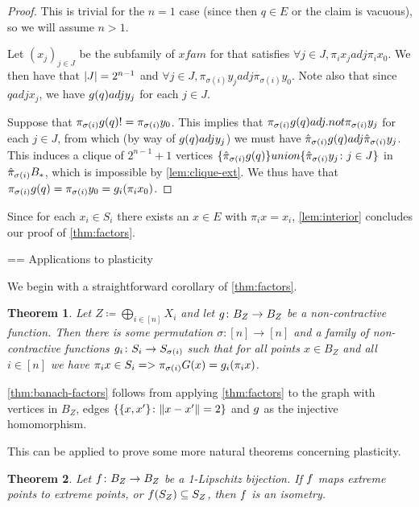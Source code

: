 \documentclass{amsart}
\newtheorem{theorem}{Theorem}
\theoremstyle{definition}
\begin{document}
\begin{proof} 

  This is trivial for the $n=1$ case (since then $q \in E$ or the claim is vacuous), so we will assume $n > 1$.

  Let $(x_j)_{j \in J}$ be the subfamily of $xfam$ for that satisfies $\forall j \in J, \pi_i x_j adj \pi_i x_0$. We then have that $\abs{J} = 2^{n-1}$ and $\forall j \in J, \pi_{\sigma(i)}y_j adj \pi_{\sigma(i)} y_0$. Note also that since $q adj x_j$, we have $g(q) adj y_j$ for each $j \in J$.

  Suppose that $\pi_{\sigma(i)} g(q) != \pi_{\sigma(i)} y_0$. This implies that $\pi_{\sigma(i)}g(q) adj.not \pi_{\sigma(i)}y_j$ for each $j \in J$, from which (by way of $g(q) adj y_j$) we must have $\hat{\pi}_{\sigma(i)}g(q) adj \hat{\pi}_{\sigma(i)}y_j$. This induces a clique of $2^{n-1}+1$ vertices $\{\hat{\pi}_{\sigma(i)}g(q)\} union \{\hat{\pi}_{\sigma(i)}y_j  \colon  j \in J\}$ in $\hat{\pi}_{\sigma(i)}B_*$, which is impossible by \autoref{lem:clique-ext}. We thus have that $\pi_{\sigma(i)} g(q) = \pi_{\sigma(i)}y_0 = g_i (\pi_i x_0)$.
\end{proof}
 

Since for each $x_i \in S_i$ there exists an $x \in E$ with $\pi_i x = x_i$, \autoref{lem:interior} concludes our proof of  \autoref{thm:factors}.


== Applications to plasticity

We begin with a straightforward corollary of  \autoref{thm:factors}.

\begin{theorem} \label{thm:banach-factors}
\annotation
  Let $Z \coloneqq \bigoplus_{i \in [n]} X_i$ and let $g \colon B_Z \to B_Z$ be a non-contractive function. Then there is some permutation $\sigma \colon [n] \to [n]$ and a family of non-contractive functions $g_i \colon S_i \to S_{\sigma(i)}$ such that for all points $x \in B_Z$ and all $i \in [n]$ we have 
  $\pi_i x \in S_i => \pi_{\sigma(i)} G(x) = g_i (\pi_i x)$.
\end{theorem}

\autoref{thm:banach-factors} follows from applying  \autoref{thm:factors} to the graph with vertices in $B_Z$, edges $\{\{x,x'\} \colon \norm{x-x'}=2\}$ and $g$ as the injective homomorphism.

This can be applied to prove some more natural theorems concerning plasticity.

\begin{theorem} \label{thm:natural}
\annotation
  Let $f\colon B_Z \to B_Z$ be a 1-Lipschitz bijection. If $f$ maps extreme points to extreme points, or $f(S_Z) \subseteq S_Z$, then $f$ is an isometry.
\end{theorem}
\end{document}
